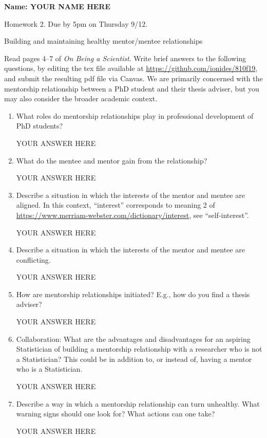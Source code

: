 \documentclass[12pt]{article}
\begin{document}
\begin{center}\bf
Name: YOUR NAME HERE

Homework 2. Due by 5pm on Thursday 9/12.

Building and maintaining healthy mentor/mentee relationships

\end{center}

Read pages 4--7 of {\em On Being a Scientist}. Write brief answers to the following questions, by editing the tex file available at \url{https://github.com/ionides/810f19}, and submit the resulting pdf file via Canvas. We are primarily concerned with the mentorship relationship between a PhD student and their thesis adviser, but you may also consider the broader academic context.

\begin{enumerate}
\item What roles do mentorship relationships play in professional development of PhD students? 

YOUR ANSWER HERE

\item What do the mentee and mentor gain from the relationship?

YOUR ANSWER HERE

\item Describe a situation in which the interests of the mentor and mentee are aligned. In this context, ``interest'' corresponds to meaning 2 of \url{https://www.merriam-webster.com/dictionary/interest}, see ``self-interest''.


YOUR ANSWER HERE

\item Describe a situation in which the interests of the mentor and mentee are conflicting. 

YOUR ANSWER HERE

\item How are mentorship relationships initiated? E.g., how do you find a thesis adviser?

YOUR ANSWER HERE

\item Collaboration: What are the advantages and disadvantages for an aspiring Statistician of building a mentorship relationship with a researcher who is not a Statistician? This could be in addition to, or instead of, having a mentor who is a Statistician.

YOUR ANSWER HERE

\item Describe a way in which a mentorship relationship can turn unhealthy. What warning signs should one look for? What actions can one take?

YOUR ANSWER HERE

\end{enumerate}
\end{document}
